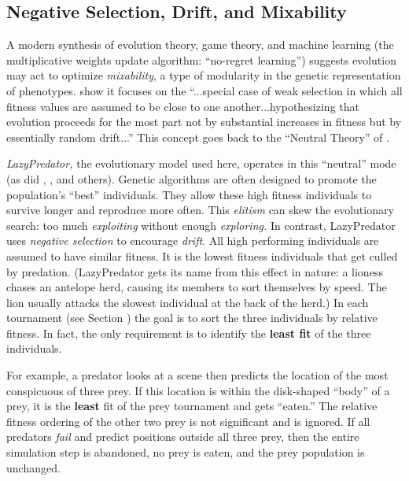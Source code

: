 \documentclass[letterpaper]{article}
\newcommand{\jargon}[1]{\textit{#1}}
\newcommand{\lazypredator}[0]{LazyPredator}
\begin{document}

\subsection{Negative Selection, Drift, and Mixability}

A modern synthesis \citep{livnat_sex_2016} of evolution theory, game theory, and machine learning (the multiplicative weights update algorithm: ``no-regret learning'') suggests evolution may act to optimize \jargon{mixability}, a type of modularity in the genetic representation of phenotypes. \citet{chastain_multiplicative_2013} show it focuses on the ``...special case of weak selection in which all fitness values are assumed to be close to one another...hypothesizing that evolution proceeds for the most part not by substantial increases in fitness but by essentially random drift...'' This concept goes back to the ``Neutral Theory'' of \citet{kimura_evolutionary_1968}.
\par
\jargon{\lazypredator{},} the evolutionary model used here, operates in this ``neutral'' mode (as did \citet{reynolds_iec_2011}, \citet{harrington_coevolution_2014}, and others). Genetic algorithms are often designed to promote the population's ``best'' individuals. They allow these high fitness individuals to survive longer and reproduce more often. This \jargon{elitism} can skew the evolutionary search: too much \jargon{exploiting} without enough \jargon{exploring.}  In contrast, \lazypredator{} uses \textit{negative selection} to encourage \jargon{drift}. All high performing individuals are assumed to have similar fitness. It is the lowest fitness individuals that get culled by predation. (LazyPredator gets its name from this effect in nature: a lioness chases an antelope herd, causing its members to sort themselves by speed. The lion usually attacks the slowest individual at the back of the herd.) In each tournament (see Section ) the goal is to sort the three individuals by relative fitness. In fact, the only requirement is to identify the \textbf{least fit} of the three individuals.
\par 
For example, a predator looks at a scene then predicts the location of the most conspicuous of three prey. If this location is within the disk-shaped ``body'' of a prey, it is the \textbf{least} fit of the prey tournament and gets ``eaten.'' The relative fitness ordering of the other two prey is not significant and is ignored. If all predators \jargon{fail} and predict positions outside all three prey, then the entire simulation step is abandoned, no prey is eaten, and the prey population is unchanged.
\end{document}

